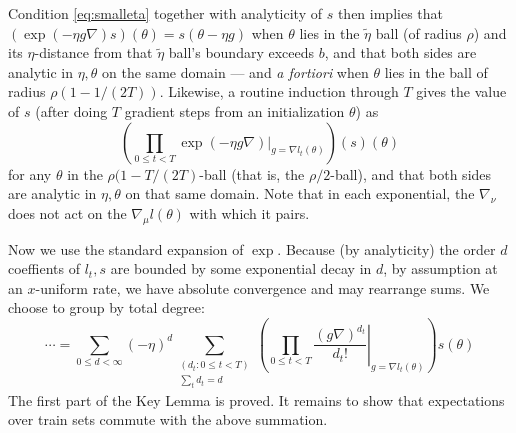\documentclass{article}
\theoremstyle{plain}
\theoremstyle{definition}
\newcommand{\wrap}[1]{\left(#1\right)}
\begin{document}
            Condition \ref{eq:smalleta} together with analyticity of $s$ then
            implies that
            $
                \wrap{\exp(-\eta g \nabla) s}(\theta) = s(\theta - \eta g)
            $
            when $\theta$ lies in the $\tilde\eta$ ball (of radius $\rho$) and
            its $\eta$-distance from that $\tilde\eta$ ball's boundary exceeds
            $b$, and that both sides are analytic in $\eta, \theta$ on the 
            same domain --- and \emph{a fortiori} when $\theta$ lies in the
            ball of radius $\rho (1 - 1/(2T))$.
            Likewise, a routine induction through $T$ gives the value of $s$
            (after doing $T$ gradient steps from an initialization $\theta$) as
            $$
                \wrap{
                    \prod_{0\leq t<T}
                        \left.
                            \exp(-\eta g \nabla)
                        \right|_{g=\nabla l_t(\theta)}
                }
                (s)(\theta)
            $$
            for any $\theta$ in the $\rho (1-T/(2T)$-ball (that is, the
            $\rho/2$-ball), and that both sides are analytic in $\eta, \theta$
            on that same domain.  Note that in each exponential, the
            $\nabla_\nu$ does not act on the $\nabla_\mu l(\theta)$ with which
            it pairs.  

            Now we use the standard expansion of $\exp$.  Because (by
            analyticity) the order $d$ coeffients of $l_t, s$ are bounded by some
            exponential decay in $d$, by assumption at an $x$-uniform rate, we
            have absolute convergence and may rearrange sums.  We choose to
            group by total degree:
            \begin{equation} \label{eq:expansion}
                \cdots 
                =
                \sum_{0\leq d < \infty} (-\eta)^d
                \sum_{\substack{(d_t: 0\leq t<T) \\ \sum_t d_t = d}}
                \wrap{
                    \prod_{0 \leq t < T} \left.
                        \frac{(g \nabla)^{d_t}}{d_t!}
                    \right|_{g=\nabla l_t(\theta)}
                } s (\theta)
            \end{equation}
            The first part of the Key Lemma is proved.  It remains to show that
            expectations over train sets commute with the above summation.
\end{document}
